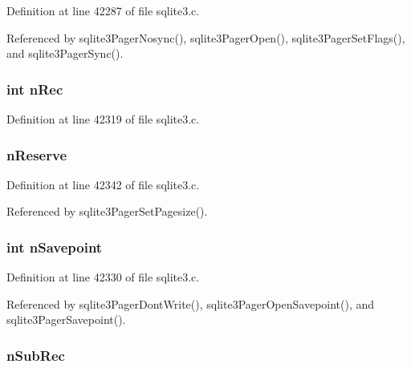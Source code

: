 Definition at line 42287 of file sqlite3.\+c.



Referenced by sqlite3\+Pager\+Nosync(), sqlite3\+Pager\+Open(), sqlite3\+Pager\+Set\+Flags(), and sqlite3\+Pager\+Sync().

\hypertarget{struct_pager_a3ef7a597d11c3d959679be103dbf3f21}{}
\subsubsection[{n\+Rec}]{\setlength{\rightskip}{0pt plus 5cm}int n\+Rec}\label{struct_pager_a3ef7a597d11c3d959679be103dbf3f21}


Definition at line 42319 of file sqlite3.\+c.

\hypertarget{struct_pager_aaf8a4d8a8f4618f4299ef0bb4b8b3ed2}{}
\subsubsection[{n\+Reserve}]{ n\+Reserve}\label{struct_pager_aaf8a4d8a8f4618f4299ef0bb4b8b3ed2}


Definition at line 42342 of file sqlite3.\+c.



Referenced by sqlite3\+Pager\+Set\+Pagesize().

\hypertarget{struct_pager_a44c5f6cd07e2fa10ce567c1bd86c5189}{}
\subsubsection[{n\+Savepoint}]{\setlength{\rightskip}{0pt plus 5cm}int n\+Savepoint}\label{struct_pager_a44c5f6cd07e2fa10ce567c1bd86c5189}


Definition at line 42330 of file sqlite3.\+c.



Referenced by sqlite3\+Pager\+Dont\+Write(), sqlite3\+Pager\+Open\+Savepoint(), and sqlite3\+Pager\+Savepoint().

\hypertarget{struct_pager_a679e99aa1ded91536e2ddcad98c3e002}{}
\subsubsection[{n\+Sub\+Rec}]{ n\+Sub\+Rec}\label{struct_pager_a679e99aa1ded91536e2ddcad98c3e002}



